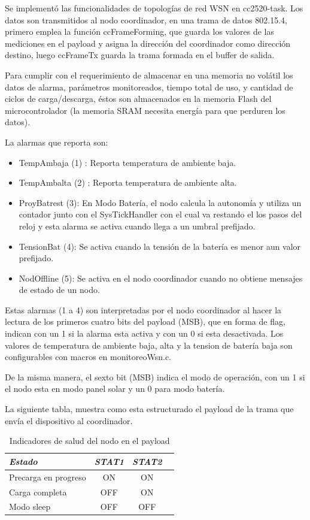 {Se implementó las funcionalidades de topologías de red WSN en cc2520-task. Los datos son transmitidos al nodo coordinador, en una trama de datos 802.15.4, primero emplea la función ccFrameForming, que guarda los valores de las mediciones en el payload y asigna la dirección del coordinador como dirección destino, luego ccFrameTx guarda la trama formada en el buffer de salida.

Para cumplir con el requerimiento de almacenar en una memoria no volátil los datos de alarma, parámetros monitoreados, tiempo total de uso, y cantidad de ciclos de carga/descarga, éstos son almacenados en la memoria Flash del microcontrolador (la memoria SRAM necesita energía para que perduren los datos). 

\noindent La alarmas que reporta son:
	\begin{itemize}
	\item TempAmbaja (1) : Reporta temperatura de ambiente baja.
	\item TempAmbalta (2) : Reporta temperatura de ambiente alta.
	\item ProyBatrest (3): En Modo Batería, el nodo calcula la autonomía y utiliza un contador junto con el SysTickHandler con el cual va restando el los pasos del reloj y esta alarma se activa cuando llega a un umbral prefijado.
	\item TensionBat (4): Se activa cuando la tensión de la batería es menor aun valor prefijado.
	\item NodOffline (5): Se activa en el nodo coordinador cuando no obtiene mensajes de estado de un nodo.
	\end{itemize}
	
Estas alarmas (1 a 4) son interpretadas por el nodo coordinador al hacer la lectura de los primeros cuatro bits del payload (MSB), que en forma de flag, indican con un 1 si la alarma esta activa y con un 0 si esta desactivada. Los valores de temperatura de ambiente baja, alta y la tension de batería baja son configurables con macros en monitoreoWsn.c.

De la misma manera, el sexto bit (MSB) indica el modo de operación, con un 1 si el nodo esta en modo panel solar y un 0 para modo batería.

La siguiente tabla, muestra como esta estructurado el payload de la trama que envía el dispositivo al coordinador.

\begin{table}[ht]
	\centering
	\caption{Indicadores de salud del nodo en el payload}
	\begin{tabular}{@{} l *3c @{}}    \toprule
		\emph{\textbf{Estado}} & \emph{\textbf{STAT1}} & \emph{\textbf{STAT2}}\\
		\midrule
		Precarga en progreso &  ON & ON \\	
		Carga completa &  OFF & ON \\
		Modo sleep &  OFF & OFF \\
		\bottomrule
		\hline
	\end{tabular}
	\label{tab:STAT}
\end{table}

}
